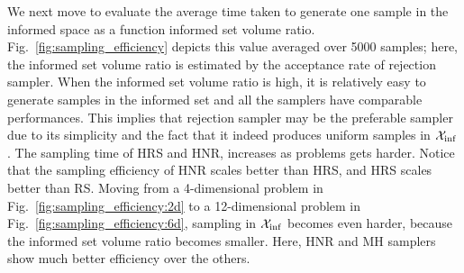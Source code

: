 \documentclass[letterpaper, 10 pt, conference]{ieeeconf}  %
\begin{document}
We next move to evaluate the average time taken to generate one sample in the informed space as a function informed set volume ratio.
Fig.~\ref{fig:sampling_efficiency} depicts this value averaged over 5000 samples; here, the informed set volume ratio is estimated by the acceptance rate of rejection sampler.
When the informed set volume ratio is high, it is relatively easy to generate samples in the informed set and all the samplers have comparable performances.
This implies that rejection sampler may be the preferable sampler due to its simplicity and the fact that it indeed produces uniform samples in $\mathcal{X}_{\rm {inf}}$.
The sampling time of HRS and HNR, increases as problems gets harder.
Notice that the sampling efficiency of HNR scales better than HRS, and HRS scales better than RS.
Moving from a 4-dimensional problem in Fig.~\ref{fig:sampling_efficiency:2d} to a 12-dimensional problem in Fig.~\ref{fig:sampling_efficiency:6d}, sampling in $\mathcal{X}_{\rm {inf}}$ becomes even harder, because the informed set volume ratio becomes smaller.
Here, HNR and MH samplers show much better efficiency over the others.
\end{document}
